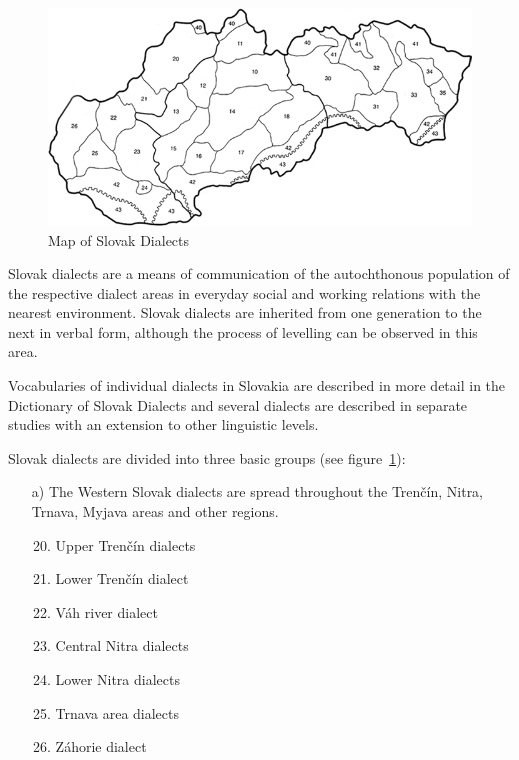 \begin{multicols}{2}
\begin{figure}[ht]
\centering
\includegraphics[width=\textwidth]{dialects-map.png}
\caption{%
Map of Slovak Dialects
}
\label{fig:dialects_en}
\end{figure}

Slovak dialects are a means of communication of the autochthonous population of the respective dialect areas in everyday social and working relations with the nearest environment. Slovak dialects are inherited from one generation to the next in verbal form, although the process of levelling can be observed in this area. 

Vocabularies of individual dialects in Slovakia are described in more detail in the Dictionary of Slovak Dialects and several dialects are described in separate studies with an extension to other linguistic levels.

Slovak dialects are divided into three basic groups (see figure~\ref{fig:dialects_en}):

\begin{itemize}

\item[a)] The Western Slovak dialects are spread throughout the Trenčín, Nitra, Trnava, Myjava areas and other regions.

\begin{enumerate}
\setcounter{enumi}{19}
\item Upper Trenčín dialects
\item Lower Trenčín dialect
\item Váh river dialect
\item Central Nitra dialects
\item Lower Nitra dialects
\item Trnava area dialects
\item Záhorie dialect
\end{enumerate}


\end{itemize}
\end{multicols}
